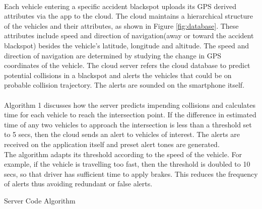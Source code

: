 \paragraph{}Each vehicle entering a specific accident blackspot uploads its GPS derived attributes via the app to the cloud. The cloud maintains a hierarchical structure of the vehicles and their attributes, as shown in Figure \ref{fig:database}. These attributes include speed and direction of navigation(away or toward the accident blackspot) besides the vehicle's latitude, longitude and altitude. The speed and direction of navigation are determined by studying the change in GPS coordinates of the vehicle. The cloud server refers the cloud database to predict potential collisions in a blackspot and alerts the vehicles that could be on probable collision trajectory. The alerts are sounded on the smartphone itself.
\paragraph{}Algorithm 1 discusses how the server predicts impending collisions and calculates time for each vehicle to reach the intersection point. If the difference in estimated time of any two vehicles to approach the intersection is less than a threshold set to 5 secs, then the cloud sends an alert to vehicles of interest. The alerts are received on the application itself and preset alert tones are generated.\\


The algorithm adapts its threshold according to the speed of the vehicle. For example, if the vehicle is travelling too fast, then the threshold is doubled to 10 secs, so that driver has sufficient time to apply brakes. This reduces the frequency of alerts thus avoiding redundant or false alerts.

\begin{algorithm}
    	\caption{Server Code Algorithm}
    	\label{Server-Code}
    	\begin{algorithmic}[1]
        			\EndIf
        		\EndIf
        	\EndIf
        	\EndProcedure
    	\end{algorithmic}
    \end{algorithm}
